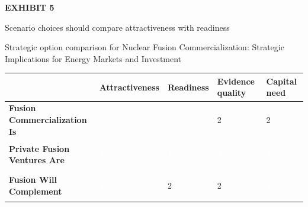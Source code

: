\documentclass[10pt,a4paper]{article}
\begin{document}
\clearpage
{\textcolor{BOGreen}{\scriptsize\bfseries EXHIBIT 5}}\par\vspace{3pt}
{\sffamily\fontsize{15}{19}\selectfont\color{BONavy} Scenario choices should compare attractiveness with readiness}\par
{\small\color{BOText} Strategic option comparison for Nuclear Fusion Commercialization: Strategic Implications for Energy Markets and Investment}\par\vspace{4pt}
{\scriptsize\begin{tabular}{p{38mm}>{\centering\arraybackslash}p{21mm}>{\centering\arraybackslash}p{21mm}>{\centering\arraybackslash}p{21mm}>{\centering\arraybackslash}p{21mm}}
 & {\bfseries Attractiveness} & {\bfseries Readiness} & {\bfseries Evidence quality} & {\bfseries Capital need} \\
\hline
{\bfseries Fusion Commercialization Is} & \colorbox{BOGreen}{\textcolor{white}{\strut\hspace{5pt}5\hspace{5pt}}} & \colorbox{BOBlue}{\textcolor{white}{\strut\hspace{5pt}3\hspace{5pt}}} & \colorbox{BOLight}{\textcolor{BOText}{\strut\hspace{5pt}2\hspace{5pt}}} & \colorbox{BOLight}{\textcolor{BOText}{\strut\hspace{5pt}2\hspace{5pt}}} \\
{\bfseries Private Fusion Ventures Are} & \colorbox{BOGreen}{\textcolor{white}{\strut\hspace{5pt}4\hspace{5pt}}} & \colorbox{BOGreen}{\textcolor{white}{\strut\hspace{5pt}4\hspace{5pt}}} & \colorbox{BOBlue}{\textcolor{white}{\strut\hspace{5pt}3\hspace{5pt}}} & \colorbox{BOBlue}{\textcolor{white}{\strut\hspace{5pt}3\hspace{5pt}}} \\
{\bfseries Fusion Will Complement} & \colorbox{BOGreen}{\textcolor{white}{\strut\hspace{5pt}4\hspace{5pt}}} & \colorbox{BOLight}{\textcolor{BOText}{\strut\hspace{5pt}2\hspace{5pt}}} & \colorbox{BOLight}{\textcolor{BOText}{\strut\hspace{5pt}2\hspace{5pt}}} & \colorbox{BOGreen}{\textcolor{white}{\strut\hspace{5pt}4\hspace{5pt}}} \\

\end{tabular}}
\end{document}
